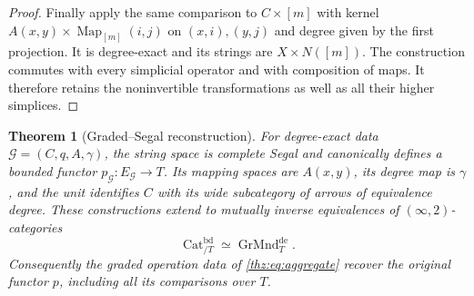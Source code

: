 \documentclass[oneside]{article}
\theoremstyle{plain}
\newtheorem{theorem}{Theorem}[section]
\theoremstyle{definition}
\theoremstyle{remark}
\newcommand{\Map}{\operatorname{Map}}
\begin{document}
\begin{proof}
Finally apply the same comparison to $C\times[m]$ with kernel
$A(x,y)\times\Map_{[m]}(i,j)$ on $(x,i),(y,j)$ and degree
given by the first projection. It is degree-exact and its strings
are $X\times N([m])$. The construction commutes with every simplicial
operator and with composition of maps. It therefore retains the
noninvertible transformations as well as all their higher simplices.
\end{proof}

\begin{theorem}[Graded--Segal reconstruction]
\label{thz:thm:graded-segal-reconstruction}
For degree-exact data $\mathcal G=(C,q,A,\gamma)$, the string space is
complete Segal and canonically defines a bounded functor
$p_{\mathcal G}:E_{\mathcal G}\to T$.  Its mapping spaces are $A(x,y)$,
its degree map is $\gamma$, and the unit identifies $C$ with its wide
subcategory of arrows of equivalence degree.  These constructions extend
to mutually inverse equivalences of $(\infty,2)$-categories
\begin{equation}\label{thz:eq:graded-category-equivalence}
 \operatorname{Cat}^{\mathrm{bd}}_{/T}
 \simeq\operatorname{GrMnd}^{\mathrm{de}}_T.
\end{equation}
Consequently the graded operation data of \eqref{thz:eq:aggregate} recover
the original functor $p$, including all its comparisons over $T$.
\end{theorem}
\end{document}
